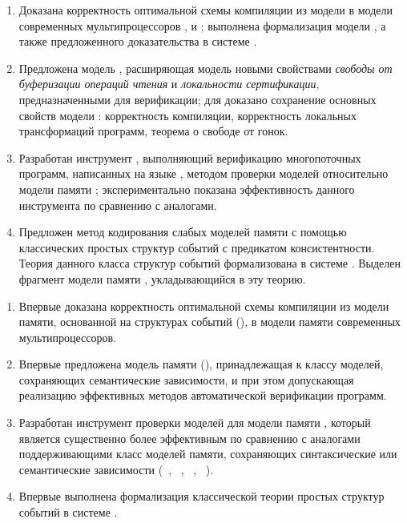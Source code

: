 {}
\begin{enumerate}[beginpenalty=10000] %

  \item Доказана корректность оптимальной схемы компиляции из модели \Wkm
    в модели современных мультипроцессоров \TSO, \ARM и \POWER;
    выполнена формализация модели \Wkm, а также  предложенного доказательства  в системе \coq.

  \item Предложена модель \WkmS, расширяющая модель \Wkm 
    новыми свойствами \emph{свободы от буферизации операций чтения}
    и \emph{локальности сертификации}, предназначенными для верификации;
    для \WkmS доказано сохранение основных свойств модели \Wkm: корректность компиляции,
    корректность локальных трансформаций программ,
    теорема о свободе от гонок.

  \item Разработан инструмент \wmc, выполняющий верификацию многопоточных программ, 
    написанных на языке \CLANG, методом проверки моделей относительно модели памяти \WkmS;
    экспериментально показана эффективность данного инструмента по сравнению с аналогами.

  \item Предложен метод кодирования слабых моделей памяти 
    с помощью классических простых структур событий с предикатом консистентности.
    Теория данного класса структур событий формализована в системе \coq.
    Выделен фрагмент модели памяти \Wkm, укладывающийся в эту теорию. 

\end{enumerate}

{\novelty}
\begin{enumerate}[beginpenalty=10000] %

  \item Впервые доказана корректность оптимальной схемы компиляции
    из модели памяти, основанной на структурах событий (\Wkm), 
    в модели памяти современных мультипроцессоров.

  \item Впервые предложена модель памяти (\WkmS),
    принадлежащая к классу моделей, сохраняющих семантические зависимости, 
    и при этом допускающая реализацию эффективных методов автоматической верификации программ. 

  \item Разработан инструмент проверки моделей \wmc для модели памяти \WkmS,
    который является существенно более эффективным по сравнению с аналогами 
    поддерживающими класс моделей памяти, 
    сохраняющих синтаксические или семантические зависимости
    (\hmc~\autocite{Kokologiannakis-Vafeiadis:ASPLOS2020},
     \rmem~\autocite{Pulte-al:PLDI2019},
     \Nidhugg~\autocite{Abdulla-al:TACAS2015,Abdulla-al:CAV2016},
     \CDSChecker~\autocite{Norris-Demsky:OOPSLA2013}).

  \item Впервые выполнена формализация классической теории 
    простых структур событий в системе \coq. 

\end{enumerate}

